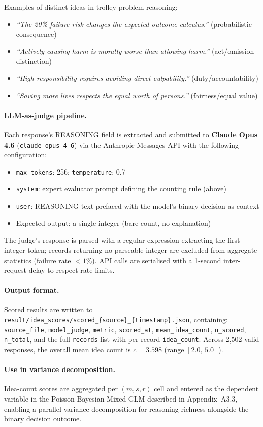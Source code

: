 \noindent Examples of distinct ideas in trolley-problem reasoning:
\begin{itemize}[noitemsep]
    \item \emph{``The 20\% failure risk changes the expected outcome calculus.''}
          (probabilistic consequence)
    \item \emph{``Actively causing harm is morally worse than allowing harm.''}
          (act/omission distinction)
    \item \emph{``High responsibility requires avoiding direct culpability.''}
          (duty/accountability)
    \item \emph{``Saving more lives respects the equal worth of persons.''}
          (fairness/equal value)
\end{itemize}

\paragraph{LLM-as-judge pipeline.}
Each response's REASONING field is extracted and submitted to \textbf{Claude Opus 4.6}
(\texttt{claude-opus-4-6}) via the Anthropic Messages API with the following
configuration:

\begin{itemize}[noitemsep]
    \item \texttt{max\_tokens}: 256; \texttt{temperature}: 0.7
    \item \texttt{system}: expert evaluator prompt defining the counting rule (above)
    \item \texttt{user}: REASONING text prefaced with the model's binary decision as context
    \item Expected output: a single integer (bare count, no explanation)
\end{itemize}

The judge's response is parsed with a regular expression extracting the first integer
token; records returning no parseable integer are excluded from aggregate statistics
(failure rate $<1\%$).  API calls are serialised with a 1-second inter-request delay to
respect rate limits.

\paragraph{Output format.}
Scored results are written to
\texttt{result/idea\_scores/scored\_\{source\}\_\{timestamp\}.json}, containing:
\texttt{source\_file}, \texttt{model\_judge}, \texttt{metric},
\texttt{scored\_at}, \texttt{mean\_idea\_count}, \texttt{n\_scored},
\texttt{n\_total}, and the full \texttt{records} list with per-record \texttt{idea\_count}.
Across 2,502 valid responses, the overall mean idea count is $\bar{c} = 3.598$
(range $[2.0,\,5.0]$).

\paragraph{Use in variance decomposition.}
Idea-count scores are aggregated per $(m, s, r)$ cell and entered as the dependent
variable in the Poisson Bayesian Mixed GLM described in Appendix~A3.3, enabling a
parallel variance decomposition for reasoning richness alongside the binary decision
outcome.
